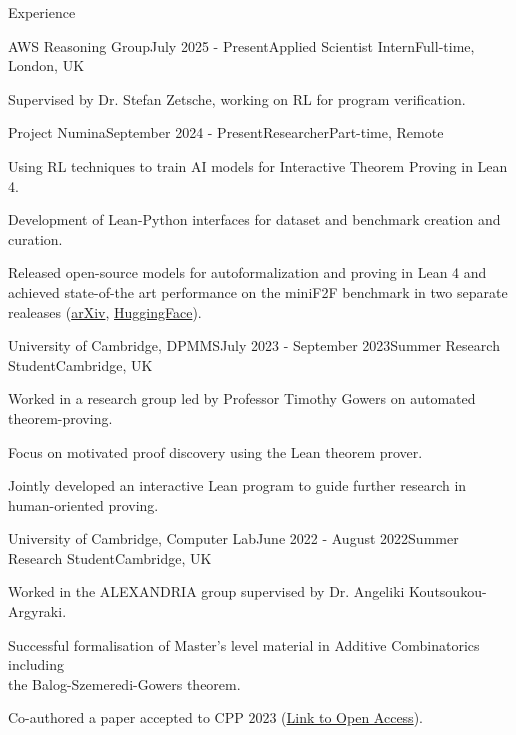 \documentclass{resume} %
\begin{document}



\begin{rSection}{Experience}

\begin{rSubsection}{AWS Reasoning Group}{July 2025 - Present}{Applied Scientist Intern}{Full-time, London, UK}

\item Supervised by Dr. Stefan Zetsche, working on RL for program verification.

\end{rSubsection}

\begin{rSubsection}{Project Numina}{September 2024 - Present}{Researcher}{Part-time, Remote}
\item Using RL techniques to train AI models for Interactive Theorem Proving in Lean 4.
\item Development of Lean-Python interfaces for dataset and benchmark creation and curation.
\item Released open-source models for autoformalization and proving in Lean 4 and achieved state-of-the art performance on the miniF2F benchmark in two separate realeases (\href{https://arxiv.org/abs/2504.11354}{arXiv}, \href{https://huggingface.co/blog/AI-MO/kimina-prover}{HuggingFace}).

\end{rSubsection}


\begin{rSubsection}{University of Cambridge, DPMMS}{July 2023 - September 2023}{Summer Research Student}{Cambridge, UK}
\item Worked in a research group led by Professor Timothy Gowers on automated theorem-proving.
\item Focus on motivated proof discovery using the Lean theorem prover.
\item Jointly developed an interactive Lean program to guide further research in human-oriented proving.
\end{rSubsection}


\begin{rSubsection}{University of Cambridge, Computer Lab}{June 2022 - August 2022}{Summer Research Student}{Cambridge, UK}
\item Worked in the ALEXANDRIA group supervised by Dr. Angeliki Koutsoukou-Argyraki.
\item Successful formalisation of Master's level material in Additive Combinatorics including \\ the Balog-Szemeredi-Gowers theorem.
\item Co-authored a paper accepted to CPP $2023$ (\href{https://dl.acm.org/doi/10.1145/3573105.3575680}{Link to Open Access}).


\end{rSubsection}
\end{rSection}
\end{document}
